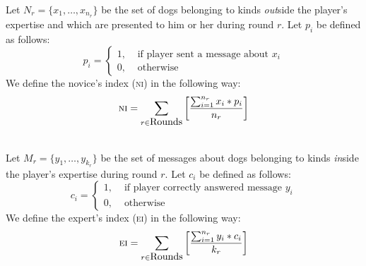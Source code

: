 \documentclass[preview]{standalone}
\begin{document}
\noindent Let $N_r=\{x_1,\ldots,x_{n_r}\}$ be the set of dogs belonging to kinds \emph{out}side the player's expertise and which are presented to him or her during round $r$. Let $p_i$ be defined as follows:
%
\[
p_i=\begin{cases}
1, &\mbox{ if player sent a message about }x_i\\
0, &\mbox{ otherwise}
\end{cases}
\]
%
We define the novice's index (\textsc{ni}) in the following way:
%
\[
\mbox{\textsc{ni}}=\displaystyle\sum_{r\in\mbox{Rounds}}\left[\frac{\sum_{i=1}^{n_r} x_i*p_i}{n_r}\right]
\]

\ \\

\noindent Let $M_r=\{y_1,\ldots,y_{k_r}\}$ be the set of messages about dogs belonging to kinds \emph{in}side the player's expertise during round $r$. Let $c_i$ be defined as follows:
%
\[
c_i=\begin{cases}
1, &\mbox{ if player correctly answered message }y_i\\
0, &\mbox{ otherwise}
\end{cases}
\]
%
We define the expert's index (\textsc{ei}) in the following way:
%
\[
\mbox{\textsc{ei}}=\displaystyle\sum_{r\in\mbox{Rounds}}\left[\frac{\sum_{i=1}^{n_r} y_i*c_i}{k_r}\right]
\]
\end{document}

